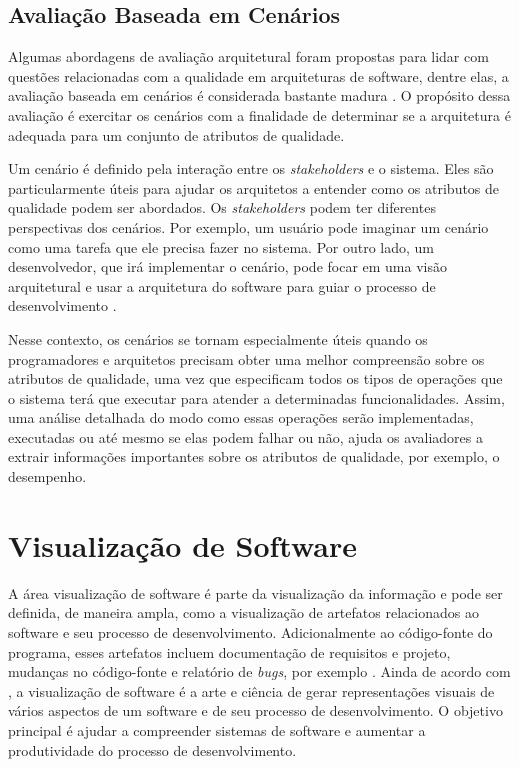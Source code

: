 \subsection{Avaliação Baseada em Cenários} \label{subsec:avaliacao-baseada-cenarios}

Algumas abordagens de avaliação arquitetural foram propostas para lidar com questões relacionadas com a qualidade em arquiteturas de software, dentre elas, a avaliação baseada em cenários é considerada bastante madura \cite{Babar2004}. O propósito dessa avaliação é exercitar os cenários com a finalidade de determinar se a arquitetura é adequada para um conjunto de atributos de qualidade.

Um cenário é definido pela interação entre os \textit{stakeholders} e o sistema. Eles são particularmente úteis para ajudar os arquitetos a entender como os atributos de qualidade podem ser abordados. Os \textit{stakeholders} podem ter diferentes perspectivas dos cenários. Por exemplo, um usuário pode imaginar um cenário como uma tarefa que ele precisa fazer no sistema. Por outro lado, um desenvolvedor, que irá implementar o cenário, pode focar em uma visão arquitetural e usar a arquitetura do software para guiar o processo de desenvolvimento \cite{Pinto2015}.

Nesse contexto, os cenários se tornam especialmente úteis quando os programadores e arquitetos precisam obter uma melhor compreensão sobre os atributos de qualidade, uma vez que especificam todos os tipos de operações que o sistema terá que executar para atender a determinadas funcionalidades. Assim, uma análise detalhada do modo como essas operações serão implementadas, executadas ou até mesmo se elas podem falhar ou não, ajuda os avaliadores a extrair informações importantes sobre os atributos de qualidade, por exemplo, o desempenho.

\section{Visualização de Software} \label{sec:visualizacao-software}

A área visualização de software é parte da visualização da informação e pode ser definida, de maneira ampla, como a visualização de artefatos relacionados ao software e seu processo de desenvolvimento. Adicionalmente ao código-fonte do programa, esses artefatos incluem documentação de requisitos e projeto, mudanças no código-fonte e relatório de \textit{bugs}, por exemplo \cite{Diehl2007}. Ainda de acordo com \citeauthor{Diehl2007}, a visualização de software é a arte e ciência de gerar representações visuais de vários aspectos de um software e de seu processo de desenvolvimento. O objetivo principal é ajudar a compreender sistemas de software e aumentar a produtividade do processo de desenvolvimento.

